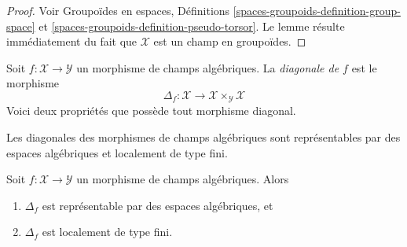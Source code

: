 \begin{proof}
Voir Groupoïdes en espaces,
Définitions \ref{spaces-groupoids-definition-group-space} et
\ref{spaces-groupoids-definition-pseudo-torsor}.
Le lemme résulte immédiatement du fait que $\mathcal{X}$ est un champ en
groupoïdes.
\end{proof}

\noindent
Soit $f:\mathcal{X}\to\mathcal{Y}$ un morphisme de champs algébriques.
La {\it diagonale de $f$} est le morphisme
$$
\Delta_f :
\mathcal{X}
\longrightarrow
\mathcal{X} \times_\mathcal{Y} \mathcal{X}
$$
Voici deux propriétés que possède tout morphisme diagonal.

\begin{lemma}
\label{lemma-properties-diagonal}
\begin{slogan}
Les diagonales des morphismes de champs algébriques sont représentables par
des espaces algébriques et localement de type fini.
\end{slogan}
Soit $f:\mathcal{X}\to\mathcal{Y}$ un morphisme de champs algébriques.
Alors
\begin{enumerate}
\item $\Delta_f$ est représentable par des espaces algébriques, et
\item $\Delta_f$ est localement de type fini.
\end{enumerate}
\end{lemma}

